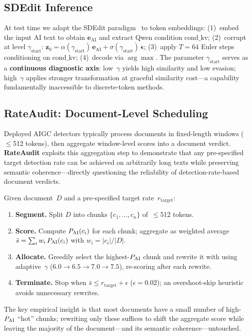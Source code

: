 \subsection{SDEdit Inference}
\label{sec:inference}

At test time we adapt the SDEdit paradigm~\citep{meng2022sdedit}
to token embeddings:
(1)~embed the input AI text to obtain
$\mathbf{e}_{\mathrm{AI}}$ and extract Qwen condition
$\mathrm{cond\_kv}$;
(2)~corrupt at level $\gamma_{\mathrm{start}}$:
$\mathbf{z}_0
  = \alpha(\gamma_{\mathrm{start}})\,\mathbf{e}_{\mathrm{AI}}
  + \sigma(\gamma_{\mathrm{start}})\,\boldsymbol{\epsilon}$;
(3)~apply $T{=}64$ Euler steps conditioning on
$\mathrm{cond\_kv}$;
(4)~decode via $\arg\max$.
The parameter $\gamma_{\mathrm{start}}$ serves as a
\textbf{continuous diagnostic axis}: low~$\gamma$ yields high
similarity and low evasion; high~$\gamma$ applies stronger
transformation at graceful similarity cost---a capability
fundamentally inaccessible to discrete-token methods.

\subsection{RateAudit: Document-Level Scheduling}
\label{sec:allocator}

Deployed AIGC detectors typically process documents in
fixed-length windows ($\leq$512 tokens), then aggregate
window-level scores into a document verdict.
\textbf{RateAudit} exploits this aggregation step to
demonstrate that any pre-specified target detection rate can be
achieved on arbitrarily long texts while preserving semantic
coherence---directly questioning the reliability of
detection-rate-based document verdicts.

Given document~$D$ and a pre-specified target
rate~$r_{\mathrm{target}}$:
\begin{enumerate}\setlength\itemsep{2pt}
    \item \textbf{Segment.}
          Split $D$ into chunks
          $\{c_1, \ldots, c_n\}$ of~$\leq$512 tokens.
    \item \textbf{Score.}
          Compute $P_{\text{AI}}(c_i)$ for each chunk;
          aggregate as weighted average
          $\bar{s} = \sum_i w_i\, P_{\text{AI}}(c_i)$ with
          $w_i = |c_i|/|D|$.
    \item \textbf{Allocate.}
          Greedily select the highest-$P_{\text{AI}}$ chunk and
          rewrite it with \styleshield{} using adaptive~$\gamma$
          ($6.0 \to 6.5 \to 7.0 \to 7.5$), re-scoring after
          each rewrite.
    \item \textbf{Terminate.}
          Stop when
          $\bar{s} \leq r_{\mathrm{target}} + \epsilon$
          ($\epsilon{=}0.02$); an overshoot-skip heuristic
          avoids unnecessary rewrites.
\end{enumerate}
The key empirical insight is that most documents have a small
number of high-$P_{\text{AI}}$ ``hot'' chunks; rewriting only these
suffices to shift the aggregate score while leaving the majority
of the document---and its semantic coherence---untouched.

